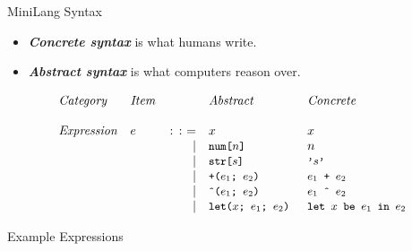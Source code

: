 \documentclass{beamer}
\renewcommand{\emph}[1]{\textbf{\textit{#1}}}
\begin{document}
\begin{frame}{MiniLang Syntax}
\begin{itemize}
\item \emph{Concrete syntax} is what humans write.
\item \emph{Abstract syntax} is what computers reason over.
\end{itemize}

\[
\begin{array}{llrl@{\hspace{0.5cm}}l}
\mathit{Category}   & \mathit{Item}   & & \mathit{Abstract} & \mathit{Concrete} \\ \\
\mathit{Expression} & e & \bnfdef & x                              & x \\
                    &   & \bnfalt & \code{num[$n$]}                & n \\
                    &   & \bnfalt & \code{str[$s$]}                & \code{'$s$'} \\
                    &   & \bnfalt & \code{+($e_1$; $e_2$)}         & \code{$e_1$ + $e_2$} \\
                    &   & \bnfalt & \code{\^{}($e_1$; $e_2$)}      & \code{$e_1$ \^{} $e_2$} \\
                    &   & \bnfalt & \code{let($x$; $e_1$; $e_2$)}  & \code{let $x$ be $e_1$ in $e_2$}
\end{array}
\]
\end{frame}


\begin{frame}{Example Expressions}
\begin{center}
\end{center}
\end{frame}
\end{document}
